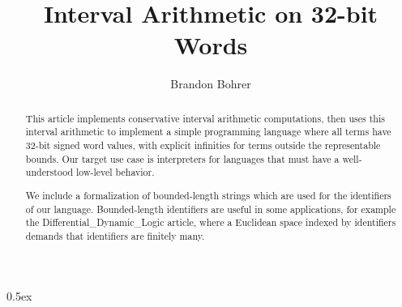 \documentclass[11pt,a4paper]{article}
\begin{document}
\title{Interval Arithmetic on 32-bit Words}
\author{Brandon Bohrer}
\maketitle

\begin{abstract}
 This article implements conservative interval arithmetic
 computations, then uses this interval arithmetic to implement a
 simple programming language where all terms have 32-bit signed word
 values, with explicit infinities for terms outside the representable
 bounds. Our target use case is interpreters for languages that must
 have a well-understood low-level behavior.

 We include a formalization of bounded-length strings which are used
 for the identifiers of our language. Bounded-length identifiers are
 useful in some applications, for example the
 Differential\_Dynamic\_Logic \cite{Differential_Dynamic_Logic-AFP}
 article, where a Euclidean space indexed by identifiers demands that
 identifiers are finitely many.
\end{abstract}
\newpage

\tableofcontents
\newpage

\parindent 0pt\parskip 0.5ex





\end{document}
